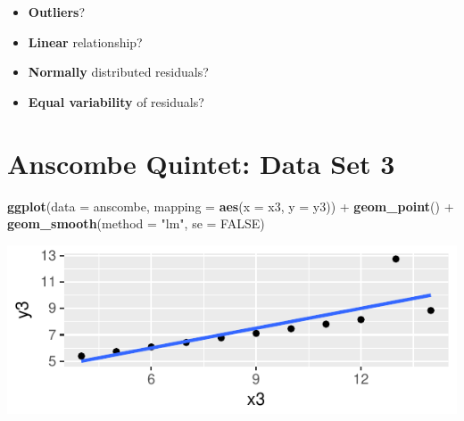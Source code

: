 \documentclass[]{article}
\newenvironment{Shaded}{\begin{snugshade}}{\end{snugshade}}
\newcommand{\KeywordTok}[1]{\textcolor[rgb]{0.13,0.29,0.53}{\textbf{{#1}}}}
\newcommand{\DataTypeTok}[1]{\textcolor[rgb]{0.13,0.29,0.53}{{#1}}}
\newcommand{\StringTok}[1]{\textcolor[rgb]{0.31,0.60,0.02}{{#1}}}
\newcommand{\OtherTok}[1]{\textcolor[rgb]{0.56,0.35,0.01}{{#1}}}
\newcommand{\NormalTok}[1]{{#1}}
\providecommand{\tightlist}{%
  \setlength{\itemsep}{0pt}\setlength{\parskip}{0pt}}
\begin{document}
\begin{itemize}
\tightlist
\item
  \textbf{Outliers}?
\end{itemize}

\vspace{1cm}

\begin{itemize}
\tightlist
\item
  \textbf{Linear} relationship?
\end{itemize}

\vspace{1cm}

\begin{itemize}
\tightlist
\item
  \textbf{Normally} distributed residuals?
\end{itemize}

\vspace{1cm}

\begin{itemize}
\tightlist
\item
  \textbf{Equal variability} of residuals?
\end{itemize}

\newpage

\section{Anscombe Quintet: Data Set
3}\label{anscombe-quintet-data-set-3}

\begin{Shaded}
\begin{Highlighting}[]
\KeywordTok{ggplot}\NormalTok{(}\DataTypeTok{data =} \NormalTok{anscombe, }\DataTypeTok{mapping =} \KeywordTok{aes}\NormalTok{(}\DataTypeTok{x =} \NormalTok{x3, }\DataTypeTok{y =} \NormalTok{y3)) +}
\StringTok{  }\KeywordTok{geom_point}\NormalTok{() +}
\StringTok{  }\KeywordTok{geom_smooth}\NormalTok{(}\DataTypeTok{method =} \StringTok{"lm"}\NormalTok{, }\DataTypeTok{se =} \OtherTok{FALSE}\NormalTok{)}
\end{Highlighting}
\end{Shaded}

\includegraphics{20180417_anscombe_residuals_files/figure-latex/unnamed-chunk-9-1.pdf}
\end{document}
